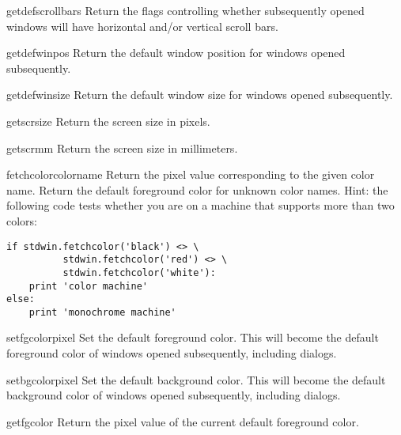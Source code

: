 \begin{funcdesc}{getdefscrollbars}{}
Return the flags controlling whether subsequently opened windows will
have horizontal and/or vertical scroll bars.
\end{funcdesc}

\begin{funcdesc}{getdefwinpos}{}
Return the default window position for windows opened subsequently.
\end{funcdesc}

\begin{funcdesc}{getdefwinsize}{}
Return the default window size for windows opened subsequently.
\end{funcdesc}

\begin{funcdesc}{getscrsize}{}
Return the screen size in pixels.
\end{funcdesc}

\begin{funcdesc}{getscrmm}{}
Return the screen size in millimeters.
\end{funcdesc}

\begin{funcdesc}{fetchcolor}{colorname}
Return the pixel value corresponding to the given color name.
Return the default foreground color for unknown color names.
Hint: the following code tests whether you are on a machine that
supports more than two colors:
\begin{verbatim}
if stdwin.fetchcolor('black') <> \
          stdwin.fetchcolor('red') <> \
          stdwin.fetchcolor('white'):
    print 'color machine'
else:
    print 'monochrome machine'
\end{verbatim}
\end{funcdesc}

\begin{funcdesc}{setfgcolor}{pixel}
Set the default foreground color.
This will become the default foreground color of windows opened
subsequently, including dialogs.
\end{funcdesc}

\begin{funcdesc}{setbgcolor}{pixel}
Set the default background color.
This will become the default background color of windows opened
subsequently, including dialogs.
\end{funcdesc}

\begin{funcdesc}{getfgcolor}{}
Return the pixel value of the current default foreground color.
\end{funcdesc}

